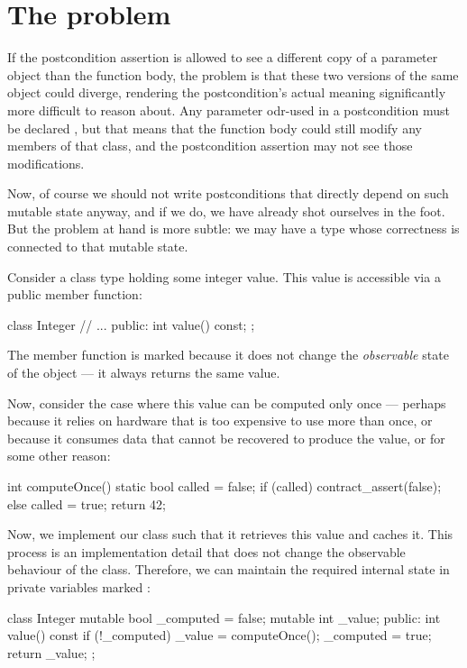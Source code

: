 \section{The problem}

If the postcondition assertion is allowed to see a different copy of a parameter object than the function body, the problem is that these two versions of the same object could diverge, rendering the postcondition's actual meaning significantly more difficult to reason about. Any parameter odr-used in a postcondition must be declared , but that means that the function body could still modify any  members of that class, and the postcondition assertion may not see those modifications.

Now, of course we should not write postconditions that directly depend on such mutable state anyway, and if we do, we have already shot ourselves in the foot. But the problem at hand is more subtle: we may have a type whose correctness is connected to that mutable state.

Consider a class type holding some integer value. This value is accessible via a public  member function:

\begin{codeblock}
class Integer {
  // ...
public:
  int value() const;
};
\end{codeblock}

The  member function is marked  because it does not change the \emph{observable} state of the object --- it always returns the same value.

Now, consider the case where this value can be computed only once --- perhaps because it relies on hardware that is too expensive to use more than once, or because it consumes data that cannot be recovered to produce the value, or for some other reason:

\begin{codeblock}
int computeOnce()
{
  static bool called = false;
  if (called) {
    contract_assert(false);
  }
  else {
    called = true;
    return 42;
  }
}
\end{codeblock}

Now, we implement our  class such that it retrieves this value and caches it. This process is an implementation detail that does not change the observable behaviour of the class. Therefore, we can maintain the required internal state in private variables marked :
 \begin{codeblock}
class Integer {
  mutable bool _computed = false;
  mutable int  _value;
public:
  int value() const {
    if (!_computed) {
      _value = computeOnce();
      _computed = true;
    }
    return _value;
  }
};
 \end{codeblock}
 
